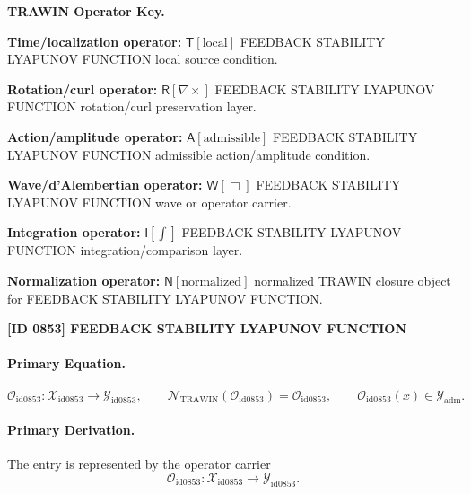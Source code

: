 \par\vspace{0.45\baselineskip}
\noindent\begin{minipage}[t]{\linewidth}
\begingroup
\small
\raggedright
\textbf{TRAWIN Operator Key.}\par
\noindent\textbf{Time/localization operator:} $\mathsf{T}\!\left[\mathrm{local}\right]$ FEEDBACK STABILITY LYAPUNOV FUNCTION local source condition.\par
\noindent\textbf{Rotation/curl operator:} $\mathsf{R}\!\left[\nabla\times\right]$ FEEDBACK STABILITY LYAPUNOV FUNCTION rotation/curl preservation layer.\par
\noindent\textbf{Action/amplitude operator:} $\mathsf{A}\!\left[\mathrm{admissible}\right]$ FEEDBACK STABILITY LYAPUNOV FUNCTION admissible action/amplitude condition.\par
\noindent\textbf{Wave/d'Alembertian operator:} $\mathsf{W}\!\left[\Box\right]$ FEEDBACK STABILITY LYAPUNOV FUNCTION wave or operator carrier.\par
\noindent\textbf{Integration operator:} $\mathsf{I}\!\left[\int\right]$ FEEDBACK STABILITY LYAPUNOV FUNCTION integration/comparison layer.\par
\noindent\textbf{Normalization operator:} $\mathsf{N}\!\left[\mathrm{normalized}\right]$ normalized TRAWIN closure object for FEEDBACK STABILITY LYAPUNOV FUNCTION.\par
\endgroup
\end{minipage}

\clearpage
\noindent\textbf{[ID 0853] FEEDBACK STABILITY LYAPUNOV FUNCTION}\par
\vspace{0.35em}
\paragraph{Primary Equation.}
\[
\mathcal{O}_{\mathrm{id0853}}:\mathcal{X}_{\mathrm{id0853}}\longrightarrow \mathcal{Y}_{\mathrm{id0853}},\qquad
\mathcal{N}_{\mathrm{TRAWIN}}(\mathcal{O}_{\mathrm{id0853}})=\mathcal{O}_{\mathrm{id0853}},\qquad
\mathcal{O}_{\mathrm{id0853}}(x)\in\mathcal{Y}_{\mathrm{adm}}.
\]

\paragraph{Primary Derivation.} The entry is represented by the operator carrier\[
\mathcal{O}_{\mathrm{id0853}}:\mathcal{X}_{\mathrm{id0853}}\longrightarrow \mathcal{Y}_{\mathrm{id0853}}.
\]

